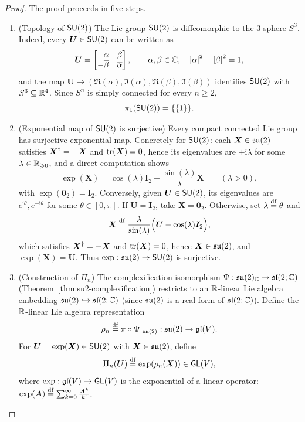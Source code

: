 \documentclass[11pt,reqno]{amsart}
\newcommand{\ii}{\mathrm{i}}
\begin{document}
\begin{proof}
The proof proceeds in five steps.

\begin{enumerate}

\item (Topology of $\operatorname{\mathsf{SU}}(2)$)
The Lie group $\operatorname{\mathsf{SU}}(2)$ is diffeomorphic to the $3$-sphere $S^3$.
Indeed, every $\bm U\in\operatorname{\mathsf{SU}}(2)$ can be written as
\[
\bm U=\mqty{\alpha&\beta\\-\overline{\beta}&\overline{\alpha}},\qquad
\alpha,\beta\in\C,\quad \abs{\alpha}^2+\abs{\beta}^2=1,
\]
and the map $\bm U\mapsto(\Re(\alpha),\Im(\alpha),\Re(\beta),\Im(\beta))$
identifies $\operatorname{\mathsf{SU}}(2)$ with $S^3\subseteq\mathbb{R}^4$.
Since $S^n$ is simply connected for every $n\ge 2$,
\[
\pi_1(\SU(2))=\set{\set{1}}.
\]

\item (Exponential map of $\operatorname{\mathsf{SU}}(2)$ is surjective)
Every compact connected Lie group has surjective exponential map.
Concretely for $\operatorname{\mathsf{SU}}(2)$: each $\bm X\in\mathfrak{su}(2)$ satisfies
$\bm X^{\dagger}=-\bm X$ and $\operatorname{tr}(\bm X)=0$, hence its eigenvalues are
$\pm\ii\lambda$ for some $\lambda\in\mathbb{R}_{\geqslant 0}$,
and a direct computation shows
\[
\exp(\bm X)=\cos(\lambda)\bm I_2+\frac{\sin(\lambda)}{\lambda}\bm X
\qquad(\lambda>0),
\]
with $\exp(\bm0_2)=\bm I_2$.
Conversely, given $\bm U\in\operatorname{\mathsf{SU}}(2)$, its eigenvalues are
$e^{\ii\theta},e^{-\ii\theta}$ for some $\theta\in[0,\pi]$.
If $\bm U=\bm I_2$, take $\bm X=\bm0_2$.
Otherwise, set $\lambda\stackrel{\mathrm{df}}{=}\theta$ and
\[
\bm X\stackrel{\mathrm{df}}{=}\frac{\lambda}{\sin(\lambda)}
\Big(\bm U-\cos(\lambda)\bm I_2\Big),
\]
which satisfies $\bm X^{\dagger}=-\bm X$ and $\operatorname{tr}(\bm X)=0$, hence $\bm X\in\mathfrak{su}(2)$,
and $\exp(\bm X)=\bm U$.
Thus $\exp:\mathfrak{su}(2)\to\operatorname{\mathsf{SU}}(2)$ is surjective.

\item (Construction of $\Pi_n$)
The complexification isomorphism
$\Psi:\mathfrak{su}(2)_{\mathbb{C}}\to\mathfrak{sl}(2;\mathbb{C})$ (Theorem~\ref{thm:su2-complexification})
restricts to an $\mathbb{R}$-linear Lie algebra embedding
$\mathfrak{su}(2)\hookrightarrow\mathfrak{sl}(2;\mathbb{C})$ (since $\mathfrak{su}(2)$ is a real form of
$\mathfrak{sl}(2;\mathbb{C})$).
Define the $\mathbb{R}$-linear Lie algebra representation
\[
\rho_n\stackrel{\mathrm{df}}{=}\pi\circ\Psi|_{\mathfrak{su}(2)}:\mathfrak{su}(2)\to\mathfrak{gl}(V).
\]
For $\bm U=\exp(\bm X)\in\operatorname{\mathsf{SU}}(2)$ with $\bm X\in\mathfrak{su}(2)$, define
\[
\Pi_n(\bm U)\df\exp\Br{\rho_n(\bm X)}\in\GL(V),
\]
where $\exp:\mathfrak{gl}(V)\to\operatorname{\mathsf{GL}}(V)$ is the exponential of a linear operator:
$\exp(\bm A)\stackrel{\mathrm{df}}{=}\sum_{k=0}^\infty \frac{\bm A^k}{k!}$.


\end{enumerate}
\end{proof}
\end{document}
